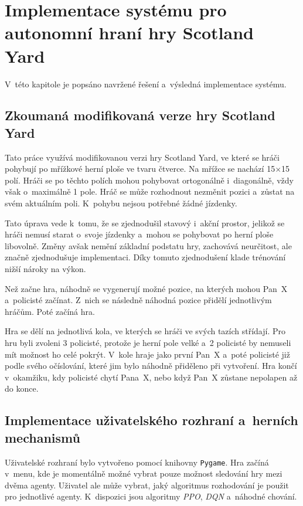 \chapter{Implementace systému pro autonomní hraní hry Scotland Yard}
\label{ch:navrh}
V~této kapitole je popsáno navržené řešení a~výsledná implementace systému.
\section{Zkoumaná modifikovaná verze hry Scotland Yard}\label{sec:zkoumana-modifikovana-verze-hry-scotland-yard}

Tato práce využívá modifikovanou verzi hry Scotland Yard, ve které se hráči pohybují po mřížkové herní ploše ve tvaru čtverce.
Na mřížce se nachází 15$\times$15 polí.
Hráči se po těchto polích mohou pohybovat ortogonálně i~diagonálně, vždy však o~maximálně 1 pole.
Hráč se může rozhodnout nezměnit pozici a~zůstat na svém aktuálním poli.
K~pohybu nejsou potřebné žádné jízdenky.

Tato úprava vede k~tomu, že se zjednodušil stavový i~akční prostor, jelikož se hráči nemusí starat o~svoje jízdenky a~mohou se pohybovat po herní ploše libovolně.
Změny avšak nemění základní podstatu hry, zachovává neurčitost, ale značně zjednodušuje implementaci.
Díky tomuto zjednodušení klade trénování nižší nároky na výkon.

Než začne hra, náhodně se vygenerují možné pozice, na kterých mohou Pan~X a~policisté začínat.
Z~nich se následně náhodná pozice přidělí jednotlivým hráčům.
Poté začíná hra.

Hra se dělí na jednotlivá kola, ve kterých se hráči ve svých tazích střídají.
Pro hru byli zvoleni 3 policisté, protože je herní pole velké a~2 policisté by nemuseli mít možnost ho celé pokrýt.
V~kole hraje jako první Pan~X a~poté policisté již podle svého očíslování, které jim bylo náhodně přiděleno při vytvoření.
Hra končí v~okamžiku, kdy policisté chytí Pana~X, nebo když Pan~X zůstane nepolapen až do konce.

\section{Implementace uživatelského rozhraní a~herních mechanismů}\label{subsec:implementace-uzivatelskeho-rozrani-a-hernich-mechanismu}

Uživatelské rozhraní bylo vytvořeno pomocí knihovny \texttt{Pygame}.
Hra začíná v~menu, kde je momentálně možné vybrat pouze možnost sledování hry mezi dvěma agenty.
Uživatel ale může vybrat, jaký algoritmus rozhodování je použit pro jednotlivé agenty.
K~dispozici jsou algoritmy \emph{PPO}, \emph{DQN} a~náhodné chování.

